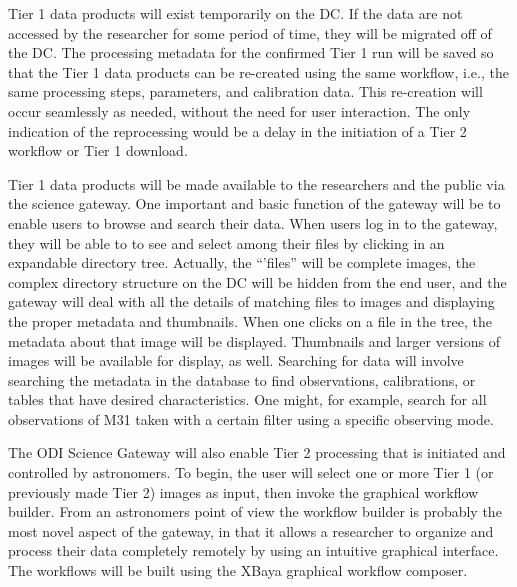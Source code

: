 \documentclass[10pt,conference]{IEEEtran}
\begin{document}
Tier 1 data products will exist temporarily on the DC. If the data are not accessed by the researcher for some period of time, they will be migrated off of the DC. The processing metadata for the confirmed Tier 1 run will be saved so that the Tier 1 data products can be re-created using the same workflow, i.e., the same processing steps, parameters, and calibration data. This re-creation will occur seamlessly as needed, without the need for user interaction. The only indication of the reprocessing would be a delay in the initiation of a Tier 2 workflow or Tier 1 download.

Tier 1 data products will be made available to the researchers and the public via the science gateway. One important and basic function of the gateway will be to enable users to browse and search their data.  When users log in to the gateway, they will be able to to see and select among their files by clicking in an expandable directory tree. Actually, the ``'files'' will be complete images, the complex directory structure on the DC will be hidden from the end user, and the gateway will deal with all the details of matching files to images and displaying the proper metadata and thumbnails. When one clicks on a file in the tree, the metadata about that image will be displayed. Thumbnails and larger versions of images will be available for display, as well.  
Searching for data will involve searching the metadata in the database to find observations, calibrations, or tables that have desired characteristics. One might, for example, search for all observations of M31 taken with a certain filter using a specific observing mode.

The ODI Science Gateway will also enable Tier 2 processing that is initiated and controlled by astronomers. To begin, the user will select one or more Tier 1 (or previously made Tier 2) images as input, then invoke the graphical workflow builder. From an astronomers point of view the workflow builder is probably the most novel aspect of the gateway, in that it allows a researcher to organize and process their data completely remotely by using an intuitive graphical interface. The workflows will be built using the XBaya graphical workflow composer.
\end{document}
